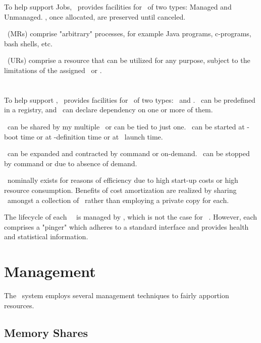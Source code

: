     To help support Jobs, \varDUCC~provides facilities for \varReservations~of two types: 
    Managed and Unmanaged. \varReservations, once allocated, are preserved until 
    canceled. 
    
    \varManagedReservations~(MRs) comprise "arbitrary" processes, for example Java
    programs, c-programs, bash shells, etc.
    
    \varUnmanagedReservations~(URs) comprise a resource that can be utilized for any 
    purpose, subject to the limitations of the assigned \varShare~or \varShares.
            
    \section{\varServices}
       
    To help support \varJobs, \varDUCC~provides facilities for \varServices~of two types: 
    \varUIMA~and \varPingOnly. \varServices~can be predefined in a registry, and 
    \varJobs~can declare dependency on one or more of them.
    
    \varServices~can be shared by my multiple \varJobs~or can be tied to just one.
    \varServices~can be started at \varDUCC-boot time or at \varService-definition time or
    at \varJob~launch time.
    
    \varServices~can be expanded and contracted by command or on-demand.  
    \varServices~can be stopped by command or due to absence of demand.
    
    \varServices~nominally exists for reasons of efficiency due to high start-up costs
    or high resource consumption.  Benefits of cost amortization are realized by sharing
    \varServices~amongst a collection of \varJobs~rather than employing a private copy 
    for each.
    
    The lifecycle of each \varUIMA~\varService~is managed by \varDUCC, which is not the
    case for \varPingOnly~\varServices.  However, each comprises a "pinger" which 
    adheres to a standard interface and provides health and statistical information.
    
    \section{Management} 
    
    The \varDUCC~system employs several management techniques to fairly apportion
    resources.
    
    \subsection{Memory Shares} 
    

